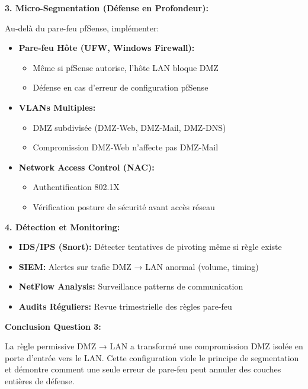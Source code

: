 \documentclass[12pt,a4paper,openany]{report}
\begin{document}
	\textbf{3. Micro-Segmentation (Défense en Profondeur):}
	
	Au-delà du pare-feu pfSense, implémenter:
	
	\begin{itemize}
		\item \textbf{Pare-feu Hôte (UFW, Windows Firewall):}
		\begin{itemize}
			\item Même si pfSense autorise, l'hôte LAN bloque DMZ
			\item Défense en cas d'erreur de configuration pfSense
		\end{itemize}
		
		\item \textbf{VLANs Multiples:}
		\begin{itemize}
			\item DMZ subdivisée (DMZ-Web, DMZ-Mail, DMZ-DNS)
			\item Compromission DMZ-Web n'affecte pas DMZ-Mail
		\end{itemize}
		
		\item \textbf{Network Access Control (NAC):}
		\begin{itemize}
			\item Authentification 802.1X
			\item Vérification posture de sécurité avant accès réseau
		\end{itemize}
	\end{itemize}
	
	\textbf{4. Détection et Monitoring:}
	
	\begin{itemize}
		\item \textbf{IDS/IPS (Snort):} Détecter tentatives de pivoting même si règle existe
		\item \textbf{SIEM:} Alertes sur trafic DMZ → LAN anormal (volume, timing)
		\item \textbf{NetFlow Analysis:} Surveillance patterns de communication
		\item \textbf{Audits Réguliers:} Revue trimestrielle des règles pare-feu
	\end{itemize}
	
	\textbf{Conclusion Question 3:}
	
	La règle permissive DMZ → LAN a transformé une compromission DMZ isolée 
	en porte d'entrée vers le LAN. Cette configuration viole le principe de 
	segmentation et démontre comment une seule erreur de pare-feu peut 
	annuler des couches entières de défense. 
	
\end{document}
